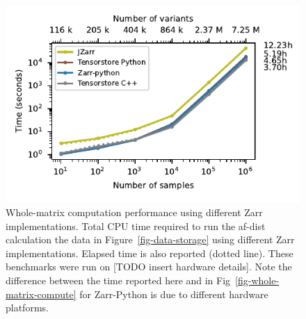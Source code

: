 \documentclass[a4paper,num-refs]{oup-contemporary}
\begin{document}
\begin{figure}[h]
\includegraphics{figures/whole-matrix-compute-zarr-versions}
\caption{Whole-matrix computation performance using different Zarr 
implementations. 
Total CPU time required to run the af-dist calculation
the data in Figure~\ref{fig-data-storage} using different Zarr implementations.
Elapsed time is also reported (dotted line). 
These benchmarks were run on [TODO insert hardware details].
Note the difference between the
time reported here and in Fig~\ref{fig-whole-matrix-compute} for Zarr-Python
is due to different hardware platforms.
\label{fig-whole-matrix-compute-zarr-versions}}
\end{figure}
\end{document}
